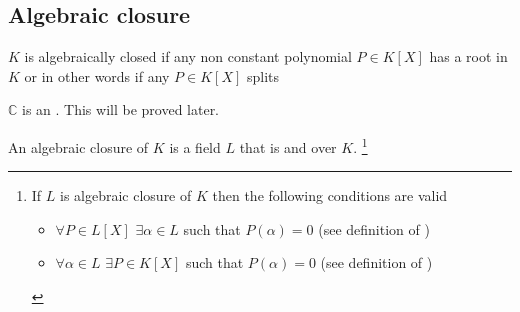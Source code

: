 \begin{example}[$X^3-2$ over $\mathbb{Q}$]
\end{example}

\subsection{Algebraic closure}

\begin{definition}
  $K$ is algebraically closed if any non constant polynomial $P \in
  K\left[X\right]$ has a root in $K$ or in other words if any $P \in
  K\left[X\right]$ splits
  \label{def:algebraicallyclosed}
\end{definition}

\begin{example}[$\mathbb{C}$]
  $\mathbb{C}$ is an . This will be
  proved later.
\end{example}

\begin{definition}
  An algebraic closure of $K$ is a field $L$ that is
   and
  over $K$.
  \footnote{
    If $L$ is algebraic closure of $K$ then the following conditions
    are valid
    \begin{itemize}
      \item $\forall P \in L\left[ X \right]$ $\exists \alpha \in L$
        such that $P\left(\alpha\right) = 0$ (see definition of
        )
      \item $\forall \alpha \in L$ $\exists P \in K\left[ X \right]$
        such that $P\left(\alpha\right) = 0$ (see definition of
        )
    \end{itemize}
  }
  \label{def:algebraicclosure}
\end{definition}

